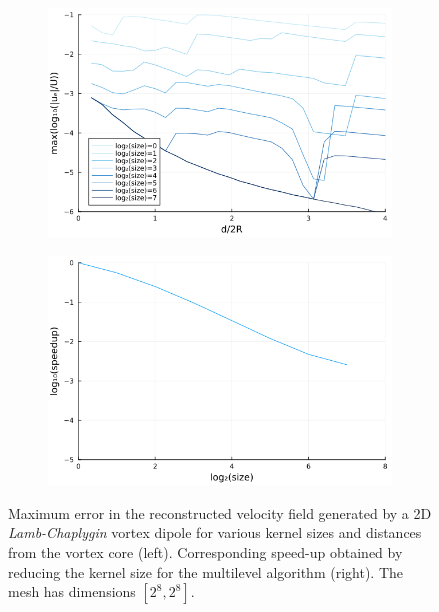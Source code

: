 \documentclass[preprint,12pt]{elsarticle}
\begin{document}
\begin{figure}
    \centering
    \begin{subfigure}{.5\textwidth}
        \centering
        \includegraphics[width=\textwidth]{tex//fig/lamb_dipole_error_dists.png}
    \end{subfigure}%
    \begin{subfigure}{.5\textwidth}
        \centering
        \includegraphics[width=\textwidth]{tex/fig/lamb_dipole_speedup_dists.png}
    \end{subfigure}
    \caption{Maximum error in the reconstructed velocity field generated by a 2D \emph{Lamb-Chaplygin} vortex dipole for various kernel sizes and distances from the vortex core (left). Corresponding speed-up obtained by reducing the kernel size for the multilevel algorithm (right). The mesh has dimensions $[2^8,2^8]$.}
    \label{fig:error_lamb_2}
\end{figure}
\end{document}
